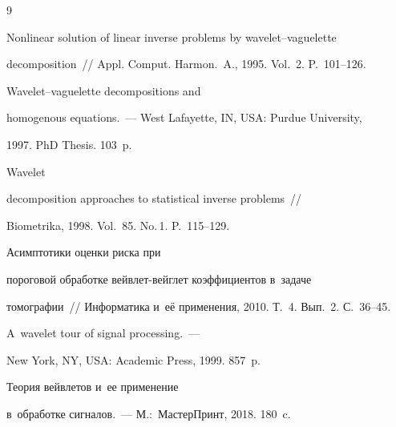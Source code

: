{\small\frenchspacing


{%




\begin{thebibliography}{9}





  


Nonlinear solution of linear inverse problems by wavelet--vaguelette 


decomposition~/\!\!/ Appl. Comput. Harmon.~A., 1995. Vol.~2. P.~101--126.





  Wavelet--vaguelette decompositions and 


homogenous equations.~--- West Lafayette, IN, USA: Purdue University, 


1997.  PhD Thesis. 103~p.





  Wavelet 


decomposition approaches to statistical inverse problems~/\!\!/ 


Biometrika, 1998. Vol.~85. No.\,1. P.~115--129.







 Асимптотики оценки риска при 


пороговой обработке вейвлет-вейглет коэффициентов в~задаче 


томографии~/\!\!/ Информатика и~её применения, 2010. Т.~4. Вып.~2. С.~36--45.





  A~wavelet tour of signal processing.~--- 


New York, NY, USA: Academic Press, 1999. 857~p.







 Теория вейвлетов и~ее применение 


в~обработке сигналов.~--- М.:~МастерПринт, 2018. 180~c.






\end{thebibliography}}}

